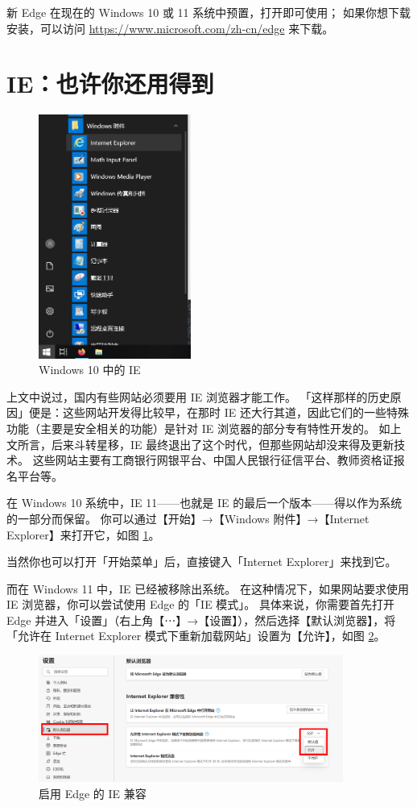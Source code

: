 新 Edge 在现在的 Windows 10 或 11 系统中预置，打开即可使用；
如果你想下载安装，可以访问 \url{https://www.microsoft.com/zh-cn/edge} 来下载。

\section{IE：也许你还用得到}

\begin{figure}
  \centering
  \includegraphics[width=5cm]{assets/IE_on_Win_10.png}
  \caption{Windows 10 中的 IE}
  \label{IE_on_Win_10}
\end{figure}

上文中说过，国内有些网站必须要用 IE 浏览器才能工作。
「这样那样的历史原因」便是：这些网站开发得比较早，在那时 IE 还大行其道，因此它们的一些特殊功能（主要是安全相关的功能）是针对 IE 浏览器的部分专有特性开发的。
如上文所言，后来斗转星移，IE 最终退出了这个时代，但那些网站却没来得及更新技术。
这些网站主要有工商银行网银平台、中国人民银行征信平台、教师资格证报名平台等。

在 Windows 10 系统中，IE 11——也就是 IE 的最后一个版本——得以作为系统的一部分而保留。
你可以通过【开始】→【Windows 附件】→【Internet Explorer】来打开它，如图 \ref{IE_on_Win_10}。

当然你也可以打开「开始菜单」后，直接键入「Internet Explorer」来找到它。

而在 Windows 11 中，IE 已经被移除出系统。
在这种情况下，如果网站要求使用 IE 浏览器，你可以尝试使用 Edge 的「IE 模式」。
具体来说，你需要首先打开 Edge 并进入「设置」（右上角【⋯】→【设置】），然后选择【默认浏览器】，将「允许在 Internet Explorer 模式下重新加载网站」设置为【允许】，如图 \ref{Edge_IE_Mode_1}。

\begin{figure}[htb!]
  \centering
  \includegraphics[width=10cm]{assets/Edge_IE_Mode_1.png}
  \caption{启用 Edge 的 IE 兼容}
  \label{Edge_IE_Mode_1}
\end{figure}

